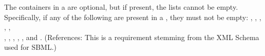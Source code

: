 The  containers in a \Model are optional, but
if present, the lists cannot be empty.  Specifically, if any of
the following are present in a \Model, they must not be empty:
, ,
, ,
, \\
,
, ,
, ,
 and .  (References:
This is a requirement stemming from the XML Schema used for SBML.)
